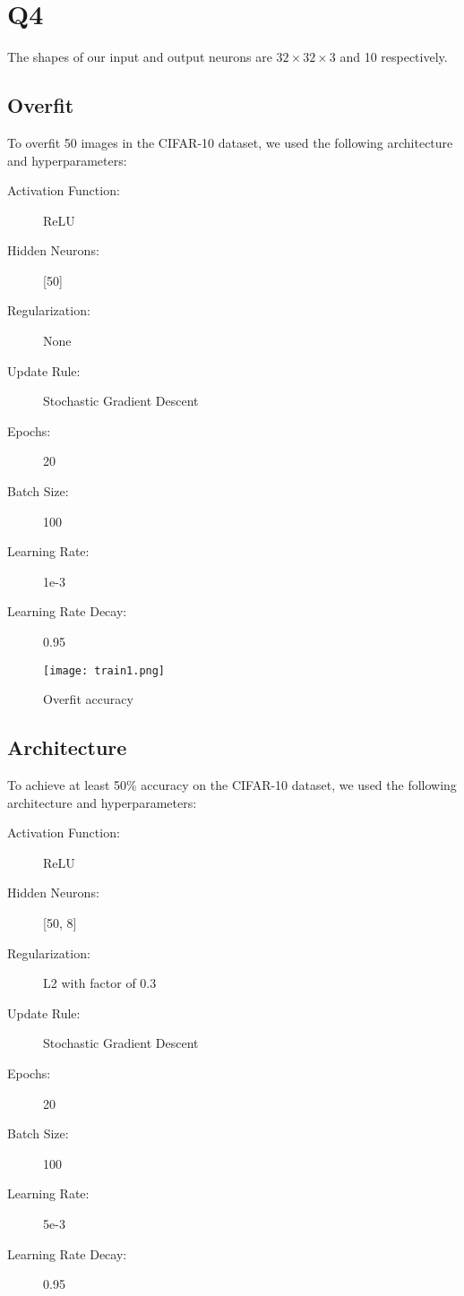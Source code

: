 \documentclass[12pt, a4paper]{article}
\begin{document}
\section*{Q4}
The shapes of our input and output neurons are $32 \times 32 \times 3$ and 10 respectively.

\subsection*{Overfit}
To overfit 50 images in the CIFAR-10 dataset, we used the following architecture and hyperparameters:
\begin{description}
    \item[Activation Function:] ReLU
    \item[Hidden Neurons:] [50]
    \item[Regularization:] None
    \item[Update Rule:] Stochastic Gradient Descent
    \item[Epochs:] 20
    \item[Batch Size:] 100
    \item[Learning Rate:] 1e-3
    \item[Learning Rate Decay:] 0.95
\end{description}

\begin{figure}
\centering
\texttt{[image: train1.png]}
\caption{Overfit accuracy}
\end{figure}

\subsection*{Architecture}
To achieve at least 50\% accuracy on the CIFAR-10 dataset, we used the following architecture and hyperparameters:
\begin{description}
    \item[Activation Function:] ReLU
    \item[Hidden Neurons:] [50, 8]
    \item[Regularization:] L2 with factor of 0.3
    \item[Update Rule:] Stochastic Gradient Descent
    \item[Epochs:] 20
    \item[Batch Size:] 100
    \item[Learning Rate:] 5e-3
    \item[Learning Rate Decay:] 0.95
\end{description}
\end{document}
